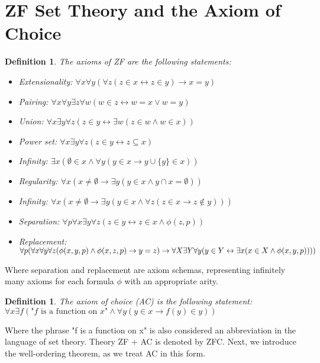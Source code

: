 \documentclass{report}
\newtheorem{dfn}[thm]{Definition}
\begin{document}
\section{ZF Set Theory and the Axiom of Choice}
\begin{dfn}
  The axioms of ZF are the following statements:
  \begin{itemize}
    \item Extensionality: $\forall x \forall y (\forall z (z \in x \leftrightarrow z \in y) \rightarrow x = y)$
    \item Pairing: $\forall x \forall y \exists z \forall w (w \in z \leftrightarrow w = x \lor w = y)$
    \item Union: $\forall x \exists y \forall z (z \in y \leftrightarrow \exists w (z \in w \land w \in x))$
    \item Power set: $\forall x \exists y \forall z (z \in y \leftrightarrow z \subseteq x)$
    \item Infinity: $\exists x (\emptyset \in x \land \forall y (y \in x \rightarrow y \cup \{y\} \in x))$
    \item Regularity: $\forall x(x \neq \emptyset \rightarrow \exists y (y \in x \land y \cap x = \emptyset))$
    \item Infinity: $\forall x (x \neq \emptyset \rightarrow \exists y (y \in x \land \forall z (z \in x \rightarrow z \notin y)))$
    \item Separation: $\forall p \forall x \exists y \forall z (z \in y \leftrightarrow z \in x \land \phi(z, p))$
    \item Replacement: $\forall p (\forall x \forall y \forall z (\phi(x, y, p) \land \phi(x, z, p) \rightarrow y = z) \rightarrow \\ \forall X \exists Y \forall y (y \in Y \leftrightarrow \exists x (x \in X \land \phi(x, y, p))))$
  \end{itemize}
\end{dfn}
Where separation and replacement are axiom schemas, representing infinitely many axioms for each formula $\phi$ with an appropriate arity.
\begin{dfn} 
  \emph{The axiom of choice (AC)} is the following statement: \\
  $\forall x \exists f (\text{"} f \text{ is a function on } x \text{"} \land \forall y (y \in x \rightarrow f(y) \in y))$
\end{dfn}
Where the phrase "f is a function on x" is also considered an abbreviation in the language of set theory.
Theory ZF + AC is denoted by ZFC.
Next, we introduce the well-ordering theorem, as we treat AC in this form.
\end{document}
